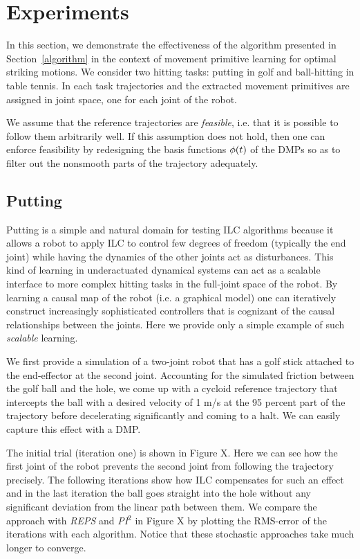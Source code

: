 \section{Experiments}\label{experiments}

In this section, we demonstrate the effectiveness of the algorithm presented in Section~\ref{algorithm} in the context of movement primitive learning for optimal striking motions. We consider two hitting tasks: putting in golf and ball-hitting in table tennis. In each task trajectories and the extracted movement primitives are assigned in joint space, one for each joint of the robot. 

We assume that the reference trajectories are \emph{feasible}, i.e. that it is possible to follow them arbitrarily well. If this assumption does not hold, then one can enforce feasibility by redesigning the basis functions $\phi(t)$ of the DMPs so as to filter out the nonsmooth parts of the trajectory adequately.

\subsection{Putting}

Putting is a simple and natural domain for testing ILC algorithms because it allows a robot to apply ILC to control few degrees of freedom (typically the end joint) while having the dynamics of the other joints act as disturbances. This kind of learning in underactuated dynamical systems can act as a scalable interface to more complex hitting tasks in the full-joint space of the robot. By learning a causal map of the robot (i.e. a graphical model) one can iteratively construct increasingly sophisticated controllers that is cognizant of the causal relationships between the joints. Here we provide only a simple example of such \emph{scalable} learning. 

We first provide a simulation of a two-joint robot that has a golf stick attached to the end-effector at the second joint. Accounting for the simulated friction between the golf ball and the hole, we come up with a cycloid reference trajectory that intercepts the ball with a desired velocity of 1 m/s at the 95 percent part of the trajectory before decelerating significantly and coming to a halt. We can easily capture this effect with a DMP.

The initial trial (iteration one) is shown in Figure X. Here we can see how the first joint of the robot prevents the second joint from following the trajectory precisely. The following iterations show how ILC compensates for such an effect and in the last iteration the ball goes straight into the hole without any significant deviation from the linear path between them. We compare the approach with \emph{REPS} and \emph{PI$^{2}$} in Figure X by plotting the RMS-error of the iterations with each algorithm. Notice that these stochastic approaches take much longer to converge.

